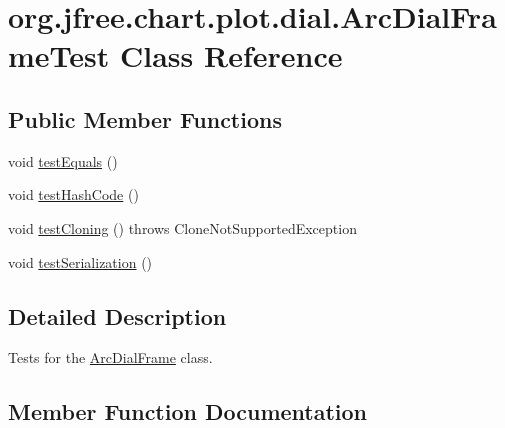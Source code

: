 \hypertarget{classorg_1_1jfree_1_1chart_1_1plot_1_1dial_1_1_arc_dial_frame_test}{}\section{org.\+jfree.\+chart.\+plot.\+dial.\+Arc\+Dial\+Frame\+Test Class Reference}
\label{classorg_1_1jfree_1_1chart_1_1plot_1_1dial_1_1_arc_dial_frame_test}
\subsection*{Public Member Functions}
\begin{DoxyCompactItemize}
\item 
void \mbox{\hyperlink{classorg_1_1jfree_1_1chart_1_1plot_1_1dial_1_1_arc_dial_frame_test_a74c8047beb27ffabb03323944cec27fc}{test\+Equals}} ()
\item 
void \mbox{\hyperlink{classorg_1_1jfree_1_1chart_1_1plot_1_1dial_1_1_arc_dial_frame_test_aa6db17f4766089fc0cc4bf5505f781e7}{test\+Hash\+Code}} ()
\item 
void \mbox{\hyperlink{classorg_1_1jfree_1_1chart_1_1plot_1_1dial_1_1_arc_dial_frame_test_a766e0213359500dd52b164bbdd177864}{test\+Cloning}} ()  throws Clone\+Not\+Supported\+Exception 
\item 
void \mbox{\hyperlink{classorg_1_1jfree_1_1chart_1_1plot_1_1dial_1_1_arc_dial_frame_test_a34048893922691997e7a38431738d6fa}{test\+Serialization}} ()
\end{DoxyCompactItemize}


\subsection{Detailed Description}
Tests for the \mbox{\hyperlink{classorg_1_1jfree_1_1chart_1_1plot_1_1dial_1_1_arc_dial_frame}{Arc\+Dial\+Frame}} class. 

\subsection{Member Function Documentation}
\mbox{\label{classorg_1_1jfree_1_1chart_1_1plot_1_1dial_1_1_arc_dial_frame_test_a766e0213359500dd52b164bbdd177864}} 
